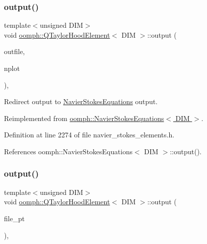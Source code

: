\subsubsection{\texorpdfstring{output()}{output()}\hspace{0.1cm}{\footnotesize\ttfamily [2/4]}}
{\footnotesize\ttfamily template$<$unsigned D\+IM$>$ \\
void \hyperlink{classoomph_1_1QTaylorHoodElement}{oomph\+::\+Q\+Taylor\+Hood\+Element}$<$ D\+IM $>$\+::output (\begin{DoxyParamCaption}\item[{std\+::ostream \&}]{outfile,  }\item[{const unsigned \&}]{nplot }\end{DoxyParamCaption})\hspace{0.3cm}{\ttfamily [inline]}, {\ttfamily [virtual]}}



Redirect output to \hyperlink{classoomph_1_1NavierStokesEquations}{Navier\+Stokes\+Equations} output. 



Reimplemented from \hyperlink{classoomph_1_1NavierStokesEquations_a2bc96a264dad4175d1aca7946db5f303}{oomph\+::\+Navier\+Stokes\+Equations$<$ D\+I\+M $>$}.



Definition at line 2274 of file navier\+\_\+stokes\+\_\+elements.\+h.



References oomph\+::\+Navier\+Stokes\+Equations$<$ D\+I\+M $>$\+::output().

\mbox{\label{classoomph_1_1QTaylorHoodElement_a75af9559b2b53886f8f256a08c315a45}} 
\subsubsection{\texorpdfstring{output()}{output()}\hspace{0.1cm}{\footnotesize\ttfamily [3/4]}}
{\footnotesize\ttfamily template$<$unsigned D\+IM$>$ \\
void \hyperlink{classoomph_1_1QTaylorHoodElement}{oomph\+::\+Q\+Taylor\+Hood\+Element}$<$ D\+IM $>$\+::output (\begin{DoxyParamCaption}\item[{F\+I\+LE $\ast$}]{file\+\_\+pt }\end{DoxyParamCaption})\hspace{0.3cm}{\ttfamily [inline]}, {\ttfamily [virtual]}}



